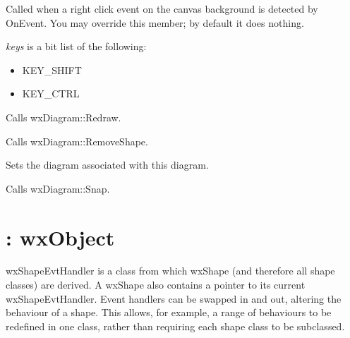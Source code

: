 \label{onrightclick}


Called when a right click event on the canvas background is detected by OnEvent. You may override this member;
by default it does nothing.

{\it keys} is a bit list of the following:

\begin{itemize}\itemsep=0pt
\item KEY\_SHIFT
\item KEY\_CTRL
\end{itemize}



Calls wxDiagram::Redraw.



Calls wxDiagram::RemoveShape.



Sets the diagram associated with this diagram.



Calls wxDiagram::Snap.



\section{: wxObject}\label{wxshapeevthandler}

wxShapeEvtHandler is a class from which wxShape (and therefore all shape classes) are derived.
A wxShape also contains a pointer to its current wxShapeEvtHandler. Event handlers
can be swapped in and out, altering the behaviour of a shape. This allows, for example,
a range of behaviours to be redefined in one class, rather than requiring
each shape class to be subclassed.




